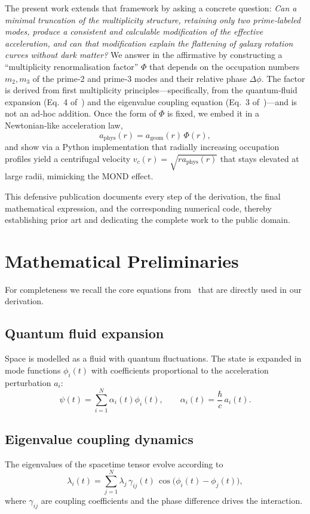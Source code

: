 \documentclass[11pt,a4paper]{article}
\theoremstyle{definition}
\theoremstyle{remark}
\begin{document}
The present work extends that framework by asking a concrete question:
\textit{Can a minimal truncation of the multiplicity structure, retaining only two prime‑labeled modes, produce a consistent and calculable modification of the effective acceleration, and can that modification explain the flattening of galaxy rotation curves without dark matter?}
We answer in the affirmative by constructing a ``multiplicity renormalisation factor'' $\Phi$ that depends on the occupation numbers $m_2,m_3$ of the prime‑2 and prime‑3 modes and their relative phase $\Delta\phi$.
The factor is derived from first multiplicity principles—specifically, from the quantum‑fluid expansion (Eq.~4 of~\cite{VanGelder2026}) and the eigenvalue coupling equation (Eq.~3 of~\cite{VanGelder2026})—and is not an ad‑hoc addition.
Once the form of $\Phi$ is fixed, we embed it in a Newtonian‑like acceleration law,
\[
a_{\text{phys}}(r) = a_{\text{geom}}(r)\,\Phi(r),
\]
and show via a Python implementation that radially increasing occupation profiles yield a centrifugal velocity $v_c(r)=\sqrt{r a_{\text{phys}}(r)}$ that stays elevated at large radii, mimicking the MOND effect.

This defensive publication documents every step of the derivation, the final mathematical expression, and the corresponding numerical code, thereby establishing prior art and dedicating the complete work to the public domain.

\section{Mathematical Preliminaries}
For completeness we recall the core equations from~\cite{VanGelder2026} that are directly used in our derivation.

\subsection{Quantum fluid expansion}
Space is modelled as a fluid with quantum fluctuations. The state is expanded in mode functions $\phi_i(t)$ with coefficients proportional to the acceleration perturbation $a_i$:
\begin{equation}
\psi(t) = \sum_{i=1}^N \alpha_i(t)\phi_i(t),\qquad 
\alpha_i(t) = \frac{\hbar}{c}\,a_i(t).
\label{eq:fluid}
\end{equation}

\subsection{Eigenvalue coupling dynamics}
The eigenvalues of the spacetime tensor evolve according to
\begin{equation}
\lambda_i(t) = \sum_{j=1}^N \lambda_j\,\gamma_{ij}(t)\,\cos\bigl(\phi_i(t)-\phi_j(t)\bigr),
\label{eq:eigen}
\end{equation}
where $\gamma_{ij}$ are coupling coefficients and the phase difference drives the interaction.
\end{document}
